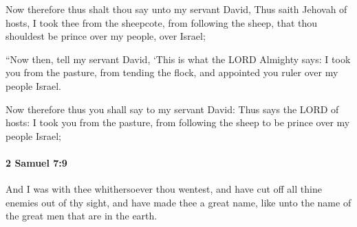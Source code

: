 			\begin{versebox}
					\item[BHS] 
					\item[ASV] Now therefore thus shalt thou say unto my servant David, Thus saith Jehovah of hosts, I took thee from the sheepcote, from following the sheep, that thou shouldest be prince over my people, over Israel;
					\item[NIV] “Now then, tell my servant David, ‘This is what the LORD Almighty says: I took you from the pasture, from tending the flock, and appointed you ruler over my people Israel.
					\item[NRSV] Now therefore thus you shall say to my servant David: Thus says the LORD of hosts: I took you from the pasture, from following the sheep to be prince over my people Israel;
			\end{versebox}

		\paragraph{2 Samuel 7:9} %
			\label{2SAMUEL-7-9}

			And I was with thee whithersoever thou wentest, and have cut off all thine enemies out of thy sight, and have made thee a great name, like unto the name of the great men that are in the earth.

